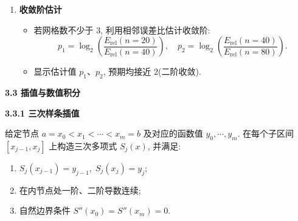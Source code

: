 \documentclass[zihao=-4,a4paper]{ctexart}
\begin{document}
\begin{enumerate}[label=\textbf{\arabic*.}, leftmargin=1cm, rightmargin=0.5cm]
    对每个 $k$(对应 $n = 20, 40, 80$)依次执行以下步骤: 
    \begin{enumerate}[label=(\arabic*)]
        \item 计算当前步长 $h = L/n$, 并记录 $h_{\text{vals}}(k) = h$. 
        \item 生成网格节点 $x = \text{linspace}(0, L, n+1)$, 取内部节点 $x_{\text{in}} = x(2:n)$, 内点数 $N = n-1$. 
        \item 按照与参考解相同的差分格式, 构造当前粗网格的系数矩阵 $\bm{A} \in \mathbb{R}^{N \times N}$ 和右端向量 $\bm{b} = f(x_{\text{in}})$. 
        \item 求解线性方程组 $\bm{A} \bm{u}_n = \bm{b}$, 得到数值解 $\bm{u}_n$. 
        \item 从参考解中提取对应粗网格内点的值: 
        利用网格点数比例 $r = n_{\text{ref}}/n$(整数), 索引为 $\text{idx}_{\text{ref}} = (1:N)^{\top} \cdot r$, 则
        \[
        \bm{u}_{\text{ref,coarse}} = \bm{u}_{\text{ref}}(\text{idx}_{\text{ref}}).
        \]
        \item 计算相对误差($2$‑范数)并存储: 
        \[
        E_{\text{rel}}(k) = \frac{\| \bm{u}_n - \bm{u}_{\text{ref,coarse}} \|_2}{\| \bm{u}_{\text{ref,coarse}} \|_2}.
        \]
        \item 输出当前网格的 $n$、$h$ 和 $E_{\text{rel}}$. 
    \end{enumerate}

    \item \textbf{收敛阶估计}
    \begin{itemize}
        \item 若网格数不少于 $3$, 利用相邻误差比估计收敛阶: 
        \[
        p_1 = \log_2 \left( \frac{E_{\text{rel}}(n=20)}{E_{\text{rel}}(n=40)} \right), \quad
        p_2 = \log_2 \left( \frac{E_{\text{rel}}(n=40)}{E_{\text{rel}}(n=80)} \right).
        \]
        \item 显示估计值 $p_1$、$p_2$, 预期均接近 $2$(二阶收敛). 
    \end{itemize}
  \end{enumerate}

\noindent\textbf{3.3 插值与数值积分}

\noindent\textbf{3.3.1 三次样条插值}

给定节点 $a = x_0 < x_1 < \cdots < x_m = b$ 及对应的函数值 $y_0,\cdots,y_m$. 在每个子区间 $[x_{j-1},x_j]$ 上构造三次多项式 $S_j(x)$, 并满足: 
\begin{enumerate}[label=(\arabic*)]
    \item $S_j(x_{j-1}) = y_{j-1},\; S_j(x_j) = y_j$;
    \item 在内节点处一阶、二阶导数连续; 
    \item 自然边界条件 $S''(x_0) = S''(x_m) = 0$. 
\end{enumerate}
\end{document}
